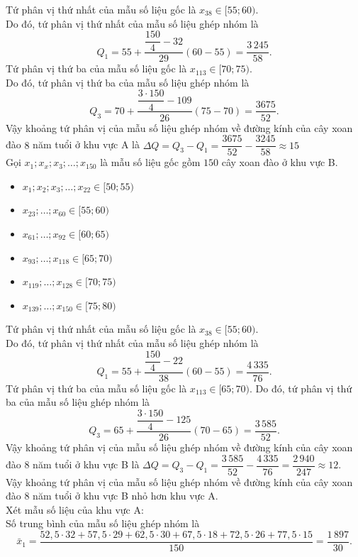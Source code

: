 \begin{ex}
{\begin{itemize}
		\end{itemize}
		Tứ phân vị thứ nhất của mẫu số liệu gốc là $x_{38} \in[55 ; 60)$.\\
		Do đó, tứ phân vị thứ nhất của mẫu số liệu ghép nhóm là
		$$Q_{1}=55+\dfrac{\dfrac{150}{4}-32}{29}(60-55)=\dfrac{3\,245}{58}.$$
		Tứ phân vị thứ ba của mẫu số liệu gốc là $x_{113} \in[70 ; 75)$.\\
		Do đó, tứ phân vị thứ ba của mẫu số liệu ghép nhóm là
		$$Q_{3}=70+\dfrac{\dfrac{3\cdot150}{4}-109}{26}(75-70)=\dfrac{3675}{52}.$$
		Vậy khoảng tứ phân vị của mẫu số liệu ghép nhóm về đường kính của cây xoan đào $8$ năm tuổi ở khu vực A là
		$\Delta Q=Q_{3}-Q_{1}=\dfrac{3675}{52}-\dfrac{3245}{58} \approx 15$\\
		Gọi $x_{1} ; x_{x} ; x_{3} ; \ldots ; x_{150}$ là mẫu số liệu gốc gồm $150$ cây xoan đào ở khu vực B.
		\begin{itemize}
			\item $x_{1} ; x_{2} ; x_{3} ; \ldots ; x_{22} \in[50 ; 55)$
			\item $ x_{23} ; \ldots ; x_{60} \in[55 ; 60)$
			\item $x_{61} ; \ldots ; x_{92} \in[60 ; 65)$
			\item $x_{93} ; \ldots ; x_{118} \in[65 ; 70)$
			\item $x_{119} ; \ldots ; x_{128} \in[70 ; 75)$
			\item $x_{139} ; \ldots ; x_{150} \in[75 ; 80)$
		\end{itemize}
		Tứ phân vị thứ nhất của mẫu số liệu gốc là $x_{38} \in[55 ; 60)$.\\
		Do đó, tứ phân vị thứ nhất của mẫu số liệu ghép nhóm là
		$$Q_{1}=55+\dfrac{\dfrac{150}{4}-22}{38}(60-55)=\dfrac{4\,335}{76}.$$
		Tứ phân vị thứ ba của mẫu số liệu gốc là $x_{113} \in[65 ; 70)$. Do đó, tứ phân vị thứ ba của mẫu số liệu ghép nhóm là
		$$Q_{3}=65+\dfrac{\dfrac{3\cdot 150}{4}-125}{26}(70-65)=\dfrac{3\,585}{52}.$$	
		Vậy khoảng tứ phân vị của mẫu số liệu ghép nhóm về đường kính của cây xoan đào $8$ năm tuổi ở khu vực B là
		$\Delta Q=Q_{3}-Q_{1}=\dfrac{3\,585}{52}-\dfrac{4\,335}{76}=\dfrac{2\,940}{247} \approx 12$.\\
		Vậy khoảng tứ phân vị của mẫu số liệu ghép nhóm về đường kính của cây xoan đào $8$ năm tuổi ở khu vực B nhỏ hơn khu vực A.\\
		Xét mẫu số liệu của khu vực A:\\
		Số trung bình của mẫu số liệu ghép nhóm là		
		$$\bar{x}_{1}=\dfrac{52{,}5\cdot 32+57{,}5\cdot 29+62{,}5\cdot 30+67{,}5\cdot 18+72{,}5\cdot 26+77{,}5\cdot 15}{150}=\dfrac{1\,897}{30}.$$
}
\end{ex}
